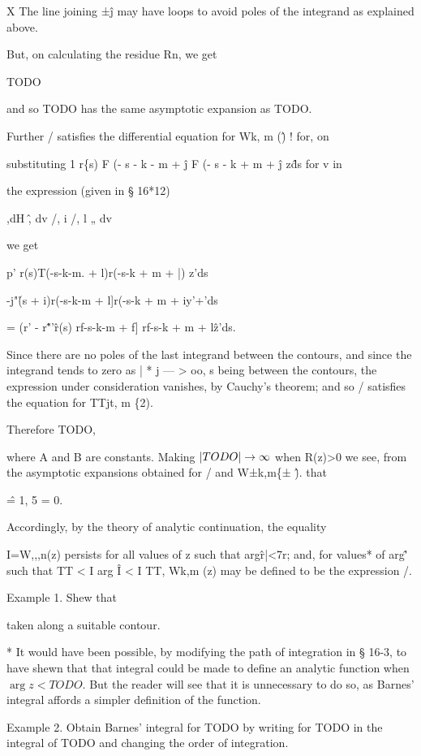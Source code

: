 X The line joining ±\^j may have loops to avoid poles of the integrand
as explained above.

%
%
But, on calculating the residue Rn, we get

TODO

and so TODO has the same asymptotic expansion as TODO.

Further / satisfies the differential equation for Wk, m (\^) ! for, on

substituting 1 r\{s) F (- s - k - m + \^j F (- s - k + m + \^j z\^ds
for v in

the expression (given in § 16*12)

,dH \^, dv /, i /, l „ dv

we get

p' r(s)T(-s-k-m. + l)r(-s-k + m + |) z'ds

-j"\r(s + i)r(-s-k-m + l]r(-s-k + m + iy'+'ds

= (r' - r\^"'\^ r(s) rf-s-k-m + f] rf-s-k + m + l\^z'ds.

Since there are no poles of the last integrand between the contours,
and since the integrand tends to zero as | * j — > oo, s being
between the contours, the expression under consideration vanishes, by
Cauchy's theorem; and so / satisfies the equation for TTjt, m \{2).

Therefore TODO,

where A and B are constants. Making $\left| TODO \right| \rightarrow \infty$
when R(z)>0 we see, from the asymptotic expansions obtained for / and
W±k,m\{± \^). that

\^ = 1, 5 = 0.

Accordingly, by the theory of analytic continuation, the equality

I=W,,,n(z) persists for all values of z such that arg\^r|<7r; and, for
values* of arg\^' such that TT < I arg \^ I < I TT, Wk,m (z) may be
defined to be the expression /.

Example 1. Shew that

taken along a suitable contour.

* It would have been possible, by modifying the path of integration in
§ 16-3, to have shewn that that integral could be made to define an
analytic function when $\arg z < TODO$. But the reader will see that
it is unnecessary to do so, as Barnes' integral affords a simpler
definition of the function.

%
%

Example 2. Obtain Barnes' integral for TODO by writing for TODO in the
integral of TODO and changing the order of integration.

